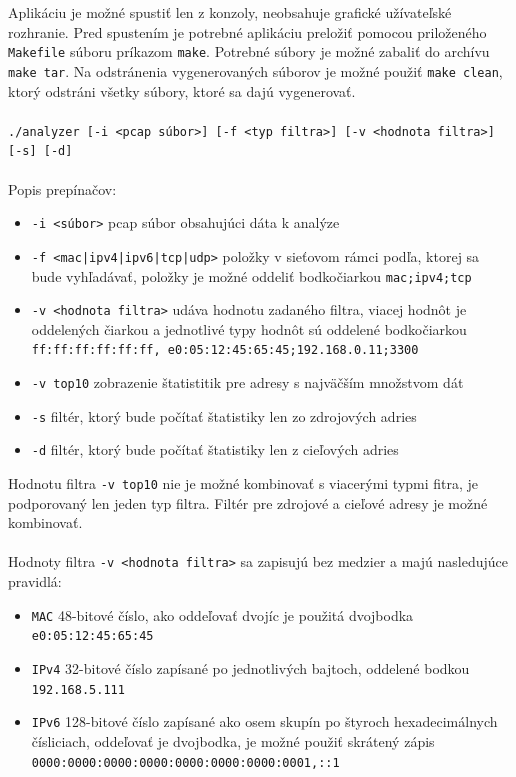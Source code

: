 \documentclass[10pt,a4paper,final]{article}
\begin{document}
\noindent Aplikáciu je možné spustiť len z konzoly, neobsahuje grafické užívateľské rozhranie. Pred spustením je potrebné aplikáciu preložiť pomocou priloženého \texttt{Makefile} súboru príkazom \texttt{make}. Potrebné súbory je možné zabaliť do archívu \texttt{make tar}. Na odstránenia vygenerovaných súborov je možné použiť \texttt{make clean}, ktorý odstráni všetky súbory, ktoré sa dajú vygenerovať.
\\\\
\texttt{./analyzer [-i <pcap súbor>] [-f <typ filtra>] [-v <hodnota filtra>] [-s] [-d]}
\\\\
Popis prepínačov:
\begin{itemize}
	\item \texttt{-i <súbor>} pcap súbor obsahujúci dáta k analýze
	\item \texttt{-f <mac|ipv4|ipv6|tcp|udp>} položky v sieťovom rámci podľa, ktorej sa bude vyhľadávať, položky je možné oddeliť bodkočiarkou \texttt{mac;ipv4;tcp}
	\item \texttt{-v <hodnota filtra>} udáva hodnotu zadaného filtra, viacej hodnôt je oddelených čiarkou a jednotlivé typy hodnôt sú oddelené bodkočiarkou \texttt{ff:ff:ff:ff:ff:ff, e0:05:12:45:65:45;192.168.0.11;3300}
	\item \texttt{-v top10}  zobrazenie štatistitik  pre adresy s najväčším množstvom dát
	\item \texttt{-s} filtér, ktorý bude počítať štatistiky len zo zdrojových adries
	\item \texttt{-d} filtér, ktorý bude počítať štatistiky len z cieľových adries
\end{itemize}

Hodnotu filtra \texttt{-v top10} nie je možné kombinovať s viacerými typmi fitra, je podporovaný len jeden typ filtra. Filtér pre zdrojové a cieľové adresy je možné kombinovať.
\\\\
Hodnoty filtra \texttt{-v <hodnota filtra>} sa zapisujú bez medzier a majú nasledujúce pravidlá:
\begin{itemize}
	\item \texttt{MAC} 48-bitové číslo, ako oddeľovať dvojíc je použitá dvojbodka \texttt{e0:05:12:45:65:45}
	\item \texttt{IPv4} 32-bitové číslo zapísané po jednotlivých bajtoch, oddelené bodkou \texttt{192.168.5.111}
	\item \texttt{IPv6} 128-bitové číslo zapísané ako osem skupín po štyroch hexadecimálnych čísliciach, oddeľovať je dvojbodka, je možné použiť skrátený zápis  \texttt{0000:0000:0000:0000:0000:0000:0000:0001,::1}

\end{itemize}
\end{document}
